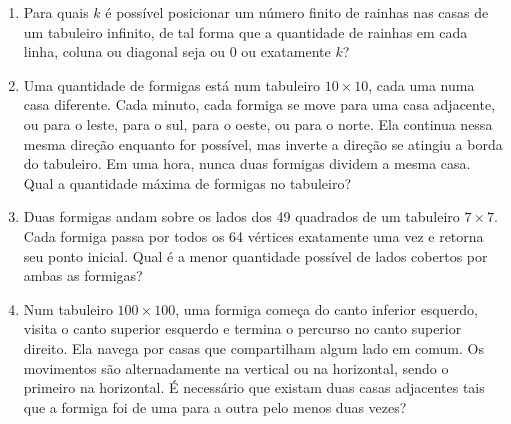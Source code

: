 \documentclass{article}
\begin{document}
\begin{enumerate}
    \item Para quais $k$ é possível posicionar um número finito de rainhas
    nas casas de um tabuleiro infinito,
    de tal forma que a quantidade de rainhas em cada linha,
    coluna ou diagonal seja ou $0$ ou exatamente $k$?
    
    \item Uma quantidade de formigas está num tabuleiro $10\times 10$,
    cada uma numa casa diferente.
    Cada minuto, cada formiga se move para uma casa adjacente,
    ou para o leste, para o sul, para o oeste, ou para o norte.
    Ela continua nessa mesma direção enquanto for possível,
    mas inverte a direção se atingiu a borda do tabuleiro.
    Em uma hora, nunca duas formigas dividem a mesma casa.
    Qual a quantidade máxima de formigas no tabuleiro?
    
    \item Duas formigas andam sobre os lados dos 49 quadrados
    de um tabuleiro $7\times 7$.
    Cada formiga passa por todos os 64 vértices exatamente uma vez
    e retorna seu ponto inicial.
    Qual é a menor quantidade possível de lados cobertos por ambas as formigas?
    
    \item Num tabuleiro $100\times 100$,
    uma formiga começa do canto inferior esquerdo,
    visita o canto superior esquerdo
    e termina o percurso no canto superior direito.
    Ela navega por casas que compartilham algum lado em comum.
    Os movimentos são alternadamente na vertical ou na horizontal,
    sendo o primeiro na horizontal.
    É necessário que existam duas casas adjacentes tais que
    a formiga foi de uma para a outra pelo menos duas vezes?
\end{enumerate}
\end{document}
